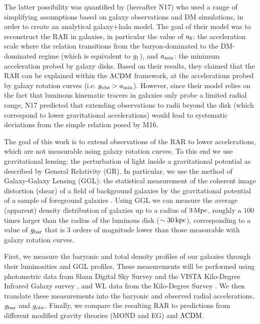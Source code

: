 \documentclass[fleqn,usenatbib]{mnras}
\newcommand{\lcdm}{{\rm \Lambda CDM}}
\newcommand{\un}[1]{_{\rm #1}}
\begin{document}
The latter possibility was quantified by \cite{navarro2017} (hereafter N17) who used a range of simplifying assumptions based on galaxy observations and DM simulations, in order to create an analytical galaxy+halo model. The goal of their model was to reconstruct the RAR in galaxies, in particular the value of $a\un{0}$: the acceleration scale where the relation transitions from the baryon-dominated to the DM-dominated regime (which is equivalent to $g\un{\dagger}$), and $a\un{min}$: the minimum acceleration probed by galaxy disks. Based on their results, they claimed that the RAR can be explained within the $\lcdm$ framework, at the accelerations probed by galaxy rotation curves (i.e. $g\un{obs}>a\un{min}$). However, since their model relies on the fact that luminous kinematic tracers in galaxies only probe a limited radial range, N17 predicted that extending observations to radii beyond the disk (which correspond to lower gravitational accelerations) would lead to systematic deviations from the simple relation posed by M16.

The goal of this work is to extend observations of the RAR to lower accelerations, which are not measurable using galaxy rotation curves. To this end we use gravitational lensing: the perturbation of light inside a gravitational potential as described by General Relativity (GR). In particular, we use the method of Galaxy-Galaxy Lensing (GGL): the statistical measurement of the coherent image distortion (shear) of a field of background galaxies by the gravitational potential of a sample of foreground galaxies \cite[for examples, see e.g.][]{fischer2000ggl,hoekstra2004,mandelbaum2006,uitert2016}. Using GGL we can measure the average (apparent) density distribution of galaxies up to a radius of $3\,{\rm Mpc}$, roughly a $100$ times larger than the radius of the luminous disk ($\sim 30\,{\rm kpc}$), corresponding to a value of $g\un{bar}$ that is $3$ orders of magnitude lower than those measurable with galaxy rotation curves.

First, we measure the baryonic and total density profiles of our galaxies through their luminosities and GGL profiles. These measurements will be performed using photometric data from Sloan Digital Sky Survey \cite[SDSS,]{abazajian2009} and the VISTA Kilo-Degree Infrared Galaxy survey \cite[VIKING]{edge2013}, and WL data from the Kilo-Degree Survey \cite[KiDS;][]{dejong2013}. We then translate these measurements into the baryonic and observed radial accelerations, $g\un{bar}$ and $g\un{obs}$. Finally, we compare the resulting RAR to predictions from different modified gravity theories (MOND and EG) and $\lcdm$.
\end{document}
